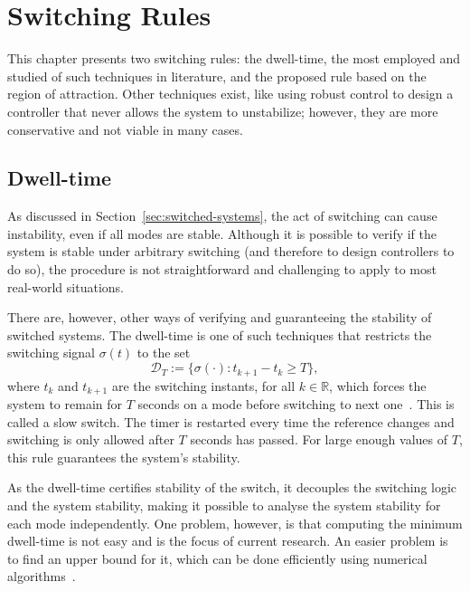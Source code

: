 
\chapter{Switching Rules}%
\label{chp:switching-rules}

This chapter presents two switching rules: the dwell-time, the most employed and
studied of such techniques in literature, and the proposed rule based on the
region of attraction. Other techniques exist, like using robust control to
design a controller that never allows the system to unstabilize; however, they
are more conservative and not viable in many cases.

\section{Dwell-time}%
\label{sec:dwell-time}

As discussed in Section~\ref{sec:switched-systems}, the act of switching can
cause instability, even if all modes are stable. Although it is possible to
verify if the system is stable under arbitrary switching (and therefore to
design controllers to do so), the procedure is not straightforward and
challenging to apply to most real-world situations.

There are, however, other ways of verifying and guaranteeing the stability of switched systems. The dwell-time is one of such
techniques that restricts the switching signal \(\sigma{}(t)\) to the set
%
\begin{equation}
  \mathcal{D}_{T} := \{\sigma(\cdot):t_{k+1}-t_{k}\ge{}T\},
\end{equation}
%
where \(t_{k}\) and \(t_{k+1}\) are the switching instants, for all
\(k\in{}\mathbb{R}\), which forces the system to remain for \(T\) seconds on a
mode before switching to next one~\parencite{colaneri:dwell}. This is called a
slow switch. The timer is restarted every time the reference changes and
switching is only allowed after \(T\) seconds has passed. For large enough
values of \(T\), this rule guarantees the system's stability.

As the dwell-time certifies stability of the switch, it decouples the switching
logic and the system stability, making it possible to analyse the system
stability for each mode independently. One problem, however, is that computing
the minimum dwell-time is not easy and is the focus of current research. An
easier problem is to find an upper bound for it, which can be done efficiently
using numerical algorithms~\parencite{colaneri:dwell}.

